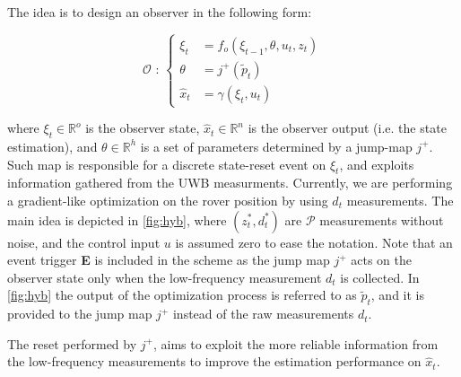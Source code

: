 \medskip
The idea is to design an observer in the following form: 

\begin{equation}
    \label{eqn:observer_hyb}
    \mathcal{O} \text{ : }
    \begin{cases}
        \xi_t &= f_o(\xi_{t-1},\theta,u_t,z_t) \\
        \theta &= j^{+}(\tilde{p}_t) \\
        \hat{x}_t &= \gamma(\xi_t,u_t) 
    \end{cases}
\end{equation}

where $\xi_t\in\mathbb{R}^o$ is the observer state, $\hat{x}_t\in\mathbb{R}^n$ is the observer output (i.e. the state estimation), and $\theta\in\mathbb{R}^h$ is a set of parameters determined by a jump-map $j^{+}$. Such map is responsible for a discrete state-reset event on $\xi_t$, and exploits information gathered from the UWB measurments. Currently, we are performing a gradient-like optimization on the rover position by using $d_t$ measurements. The main idea is depicted in \cref{fig:hyb}, where $(z_t^*,d_t^*)$ are $\mathcal{P}$ measurements without noise, and the control input $u$ is assumed zero to ease the notation. Note that an event trigger \textbf{E} is included in the scheme as the jump map $j^+$ acts on the observer state only when the low-frequency measurement $d_t$ is collected. In \cref{fig:hyb} the output of the optimization process is referred to as $\tilde{p}_t$, and it is provided to the jump map $j^+$ instead of the raw measurements $d_t$.

\medskip
The reset performed by $j^+$, aims to exploit the more reliable information from the low-frequency measurements to improve the estimation performance on $\hat{x}_t$. 


